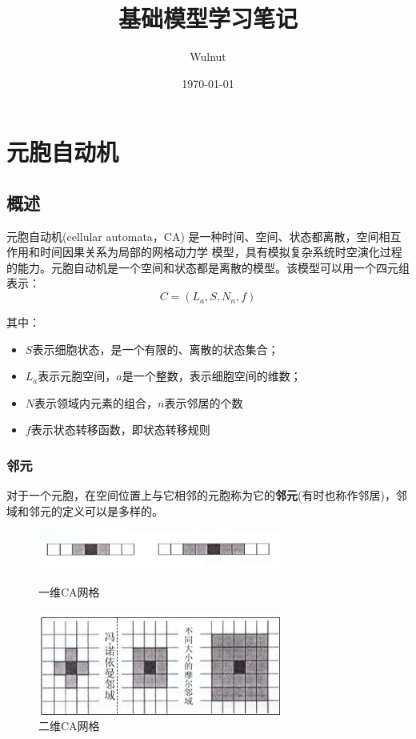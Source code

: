\documentclass[UTF8]{ctexart}
\title{基础模型学习笔记}
\author{Wulnut}
\date{\today}
\begin{document}
    \maketitle
    \newpage
    \tableofcontents
    \newpage

    \section{元胞自动机}
    \subsection{概述}
    元胞自动机(cellular automata，CA) 是一种时间、空间、状态都离散，空间相互作用和时间因果关系为局部的网格动力学
模型，具有模拟复杂系统时空演化过程的能力。元胞自动机是一个空间和状态都是离散的模型。该模型可以用一个四元组表示：
    \begin{equation}
    C=(L_a, S, N_n, f)
    \end{equation}

    其中：
    \begin{itemize}
        \item $S$表示细胞状态，是一个有限的、离散的状态集合；
        \item $L_a$表示元胞空间，$a$是一个整数，表示细胞空间的维数；
        \item $N$表示领域内元素的组合，$n$表示邻居的个数
        \item $f$表示状态转移函数，即状态转移规则
    \end{itemize}

    \subsubsection{邻元}
    对于一个元胞，在空间位置上与它相邻的元胞称为它的\textbf{邻元}(有时也称作邻居)，邻域和邻元的定义可以是多样的。

    \begin{figure}[h]
        \centering
        \includegraphics[width=8cm]{img/CA_table.png}%
        \caption{一维CA网格}

        \includegraphics[width=8cm]{img/CA_table(1).png}
        \caption{二维CA网格}
    \end{figure}
\end{document}
